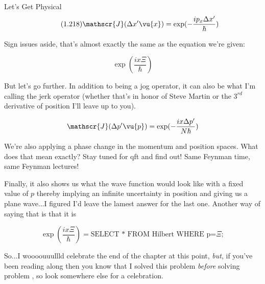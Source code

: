 \begin{answer}
\begin{answerpart}{Let's Get Physical}
    \begin{equation}
      \tag{1.218}
      \mathscr{J}(\Delta x' \vu{x}) = \exp(- \frac{ip_x\Delta x'}{\hbar})
    \end{equation}

    Sign issues aside, that's almost exactly the same as the equation
    we're given:

    \begin{equation}
      \exp(\frac{ix\Xi}{\hbar})
    \end{equation}

    But let's go further.  In addition to being a jog operator, it can
    also be what I'm calling the jerk operator (whether that's in
    honor of Steve Martin or the $3^{rd}$ derivative of position I'll
    leave up to you).

    \begin{equation}
      \mathscr{J}(\Delta p' \vu{p}) = \exp(- \frac{ix\Delta p'}{N\hbar})
    \end{equation}

    We're also applying a phase change in the momentum and position
    spaces.  What does that mean exactly?  Stay tuned for \ac{qft} and
    find out!  Same Feynman time, same Feynman lectures!

    Finally, it also shows us what the wave function would look like
    with a fixed value of $p$ thereby implying an infinite uncertainty
    in position and giving us a plane wave...I figured I'd leave the
    lamest answer for the last one.  Another way of saying that is
    that it is

    \begin{equation}
      \exp(\frac{ix\Xi}{\hbar})
      = \text{SELECT * FROM Hilbert WHERE p=$\Xi$};
    \end{equation}

  \end{answerpart}

  So...I woooouuullld celebrate the end of the chapter at this point,
  \emph{but}, if you've been reading along then you know that I solved
  this problem \emph{before} solving problem
  , so look somewhere else for a
  celebration.

\end{answer}
